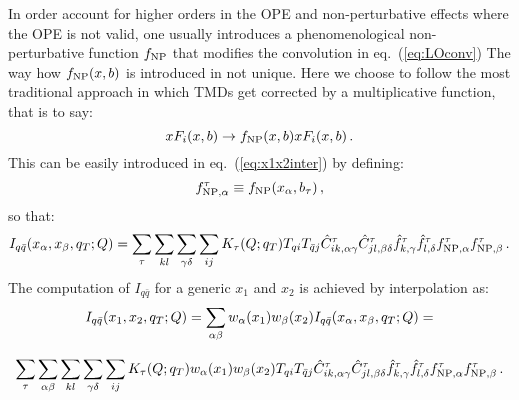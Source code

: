 \documentclass[10pt,a4paper]{article}
\begin{document}
In order account for higher orders in the OPE and non-perturbative
effects where the OPE is not valid, one usually introduces a
phenomenological non-perturbative function $f_{\rm NP}$ that modifies
the convolution in eq.~(\ref{eq:LOconv}) The way how $f_{\rm NP}(x,b)$
is introduced in not unique. Here we choose to follow the most
traditional approach in which TMDs get corrected by a multiplicative
function, that is to say:
\begin{equation}\label{eq:LOconvNP1}
  xF_i(x,b) \rightarrow f_{\rm NP}(x,b) xF_i(x,b)\,.
\end{equation}
This can be easily introduced in eq.~(\ref{eq:x1x2inter}) by defining:
\begin{equation}
f_{{\rm NP},\alpha}^\tau \equiv f_{\rm NP}(x_\alpha,b_\tau)\,,
\end{equation}
so that:
\begin{equation}\label{eq:lumiInterRotNP}
I_{q\bar{q}}(x_\alpha,x_\beta,q_T;Q)= \sum_\tau \sum_{kl} \sum_{\gamma\delta}\sum_{ij}K_\tau(Q;q_T) T_{qi}T_{\bar{q}j}\hat{C}_{ik,\alpha\gamma}^\tau
  \hat{C}_{jl,\beta\delta}^\tau \hat{f}_{k,\gamma}^\tau \hat{f}_{l,\delta}^\tau f_{{\rm NP},\alpha}^\tau f_{{\rm NP},\beta}^\tau\,.
\end{equation}
The computation of $I_{q\bar{q}}$ for a generic $x_1$ and $x_2$ is
achieved by interpolation as:
\begin{equation}\label{eq:x1x2inter}
\begin{array}{c}
  \displaystyle I_{q\bar{q}}(x_1,x_2,q_T;Q) =
  \sum_{\alpha\beta}w_\alpha(x_1)w_\beta(x_2)I_{q\bar{q}}(x_\alpha,x_\beta,q_T;Q)
  =\\
\\
\displaystyle \sum_\tau\sum_{\alpha\beta} \sum_{kl} \sum_{\gamma\delta}\sum_{ij}K_\tau(Q;q_T)w_\alpha(x_1)w_\beta(x_2) T_{qi}T_{\bar{q}j}\hat{C}_{ik,\alpha\gamma}^\tau
  \hat{C}_{jl,\beta\delta}^\tau \hat{f}_{k,\gamma}^\tau \hat{f}_{l,\delta}^\tau f_{{\rm NP},\alpha}^\tau f_{{\rm NP},\beta}^\tau\,.
\end{array}
\end{equation}
\end{document}
